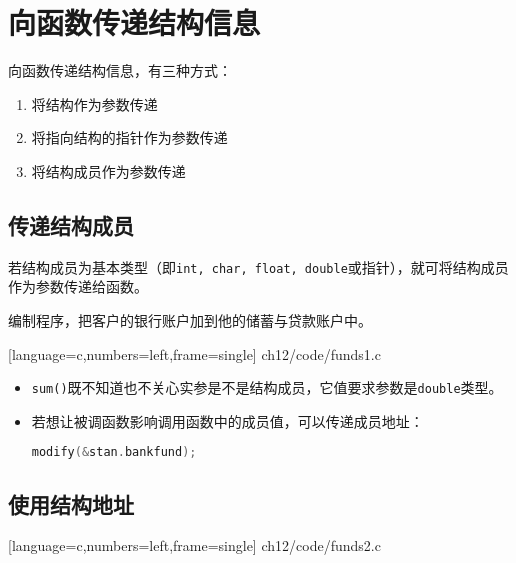\section{向函数传递结构信息}

\begin{frame}[fragile]\ft{\secname}
向函数传递结构信息，有三种方式：
\begin{enumerate}
\item 将结构作为参数传递
\item 将指向结构的指针作为参数传递
\item 将结构成员作为参数传递
\end{enumerate}
\end{frame}

\subsection{传递结构成员}
\begin{frame}[fragile]\ft{\subsecname}
若结构成员为基本类型（即\verb|int, char, float, double|或指针），就可将结构成员作为参数传递给函数。
\end{frame}

\begin{frame}[fragile]\ft{\subsecname}
\begin{li}
  编制程序，把客户的银行账户加到他的储蓄与贷款账户中。
\end{li}
\end{frame}

\begin{frame}\ft{\subsecname}
  
  [language=c,numbers=left,frame=single]  
  {ch12/code/funds1.c}
\end{frame}


\begin{frame}[fragile]\ft{\subsecname}
  \begin{itemize}
  \item \verb|sum()|既不知道也不关心实参是不是结构成员，它值要求参数是\verb|double|类型。
  \item 若想让被调函数影响调用函数中的成员值，可以传递成员地址：
    \begin{lstlisting}[language=c,backgroundcolor=\color{red!20}]
modify(&stan.bankfund);
    \end{lstlisting}
  \end{itemize}
\end{frame}


\subsection{使用结构地址}
\begin{frame}\ft{\subsecname}
  
  [language=c,numbers=left,frame=single]  
  {ch12/code/funds2.c}
\end{frame}


